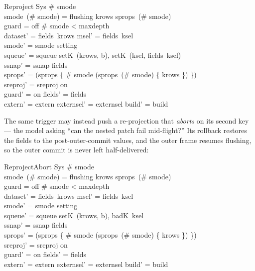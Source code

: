 \documentclass[a4paper,10pt,fleqn]{article}
\begin{document}
\begin{schema}{Reproject}
  \Delta Sys
\where
  \# smode  \\
  smode~(\# smode) = flushing \land krows \in sprops~(\# smode) \\
  guard = off \land \# smode < maxdepth \\
  dataset' = fields~krows \land msel' = fields~ksel \\
  smode' = smode \cat \langle setting \rangle \\
  squeue' = squeue \cat
    \langle \langle setK~(krows, b), setK~(ksel, fields~ksel) \rangle \rangle \\
  ssnap' = ssnap \cat \langle fields \rangle \\
  sprops' = (sprops \oplus \{ \# smode \mapsto
             (sprops~(\# smode) \setminus \{ krows \}) \}) \cat \langle \emptyset \rangle \\
  sreproj' = sreproj \cat \langle on \rangle \\
  guard' = on \land fields' = fields \\
  \land extern' = extern \land externsel' = externsel \land build' = build
\end{schema}

The same trigger may instead push a re-projection that \emph{aborts} on its
second key --- the model asking ``can the nested patch fail mid-flight?''  Its
rollback restores the fields to the post-outer-commit values, and the outer frame
resumes flushing, so the outer commit is never left half-delivered:

\begin{schema}{ReprojectAbort}
  \Delta Sys
\where
  \# smode  \\
  smode~(\# smode) = flushing \land krows \in sprops~(\# smode) \\
  guard = off \land \# smode < maxdepth \\
  dataset' = fields~krows \land msel' = fields~ksel \\
  smode' = smode \cat \langle setting \rangle \\
  squeue' = squeue \cat
    \langle \langle setK~(krows, b), badK~ksel \rangle \rangle \\
  ssnap' = ssnap \cat \langle fields \rangle \\
  sprops' = (sprops \oplus \{ \# smode \mapsto
             (sprops~(\# smode) \setminus \{ krows \}) \}) \cat \langle \emptyset \rangle \\
  sreproj' = sreproj \cat \langle on \rangle \\
  guard' = on \land fields' = fields \\
  \land extern' = extern \land externsel' = externsel \land build' = build
\end{schema}
\end{document}
